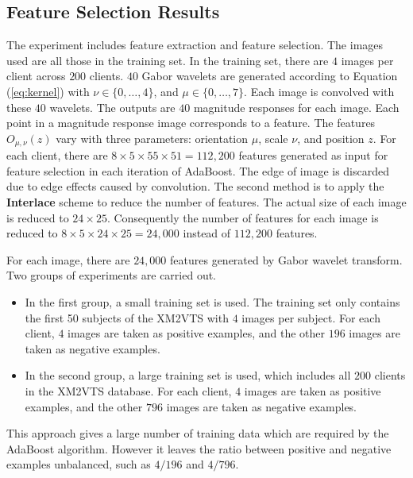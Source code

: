 \subsection{Feature Selection Results}
\label{sec:faceveri:result1}
The experiment includes feature extraction and feature selection. The images used are all those in the training set. In the training set, there are $4$ images per client across $200$ clients. $40$ Gabor wavelets are generated according to \mbox{Equation} (\ref{eq:kernel}) with $\nu\in\{0,\ldots,4\}$, and $\mu\in\{0,\ldots,7\}$. Each image is convolved with these $40$ wavelets. The outputs are $40$ magnitude responses for each image. Each point in a magnitude response image corresponds to a feature. The features $O_{\mu,\nu}(z)$ vary with three parameters: orientation $\mu$, scale $\nu$, and position $z$. For each client, there are $8\times5\times55\times51=112,200$ features generated as input for feature selection in each iteration of AdaBoost. The edge of image is discarded due to edge effects caused by convolution. The second method is to apply the \textbf{Interlace} scheme to reduce the number of features. The actual size of each image is reduced to $24\times25$. Consequently the number of features for each image is reduced to $8\times5\times24\times25=24,000$ instead of $112,200$ features.

For each image, there are $24,000$ features generated by Gabor wavelet transform. Two groups of experiments are carried out.
\begin{itemize}
 \item In the first group, a small training set is used. The training set only contains the first 50 subjects of the XM2VTS with $4$ images per subject. For each client, $4$ images are taken as positive examples, and the other $196$ images are taken as negative examples.
 \item In the second group, a large training set is used, which includes all $200$ clients in the XM2VTS database. For each client, $4$ images are taken as positive examples, and the other $796$ images are taken as negative examples.
\end{itemize}
 
This approach gives a large number of training data which are required by the AdaBoost algorithm. However it leaves the ratio between positive and negative examples unbalanced, such as $4/196$ and $4/796$.

